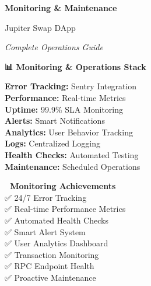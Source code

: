 \documentclass[11pt,a4paper]{article}
\begin{document}
\begin{titlepage}
    \centering
    \vspace*{1cm}
    
    {\Huge\textbf{\textcolor{jupiterBlue}{Monitoring \& Maintenance}}\par}
    \vspace{0.5cm}
    {\LARGE\textcolor{deauraPurple}{Jupiter Swap DApp}\par}
    \vspace{0.3cm}
    {\Large\textit{Complete Operations Guide}\par}
    
    \vspace{1.5cm}
    
    \begin{tcolorbox}[colback=jupiterBlue!10,colframe=jupiterBlue,width=0.9\textwidth]
        \centering
        \textbf{📊 Monitoring \& Operations Stack}\\
        \vspace{0.5cm}
        \begin{multicols}{2}
        \textbf{Error Tracking:} Sentry Integration\\
        \textbf{Performance:} Real-time Metrics\\
        \textbf{Uptime:} 99.9\% SLA Monitoring\\
        \textbf{Alerts:} Smart Notifications\\
        \textbf{Analytics:} User Behavior Tracking\\
        \textbf{Logs:} Centralized Logging\\
        \textbf{Health Checks:} Automated Testing\\
        \textbf{Maintenance:} Scheduled Operations
        \end{multicols}
    \end{tcolorbox}
    
    \vspace{1.5cm}
    
    \begin{tcolorbox}[colback=successGreen!10,colframe=successGreen,width=0.8\textwidth]
        \centering
        \textbf{🎯 Monitoring Achievements}\\
        \vspace{0.3cm}
        ✅ 24/7 Error Tracking\\
        ✅ Real-time Performance Metrics\\
        ✅ Automated Health Checks\\
        ✅ Smart Alert System\\
        ✅ User Analytics Dashboard\\
        ✅ Transaction Monitoring\\
        ✅ RPC Endpoint Health\\
        ✅ Proactive Maintenance
    \end{tcolorbox}
    

\end{titlepage}
\end{document}
